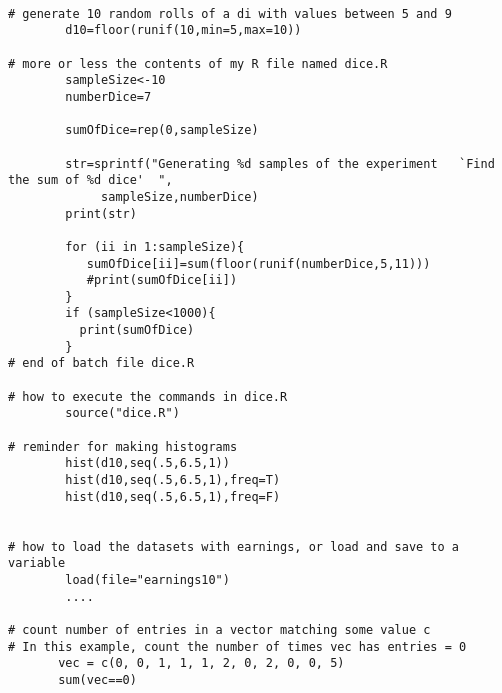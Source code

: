 \documentclass{report}
\begin{document}
\bigskip

\begin{verbatim}

# generate 10 random rolls of a di with values between 5 and 9
        d10=floor(runif(10,min=5,max=10))               
                                   
# more or less the contents of my R file named dice.R                                                                               
        sampleSize<-10
        numberDice=7

        sumOfDice=rep(0,sampleSize)

        str=sprintf("Generating %d samples of the experiment   `Find the sum of %d dice'  ",
             sampleSize,numberDice)
        print(str)

        for (ii in 1:sampleSize){
           sumOfDice[ii]=sum(floor(runif(numberDice,5,11)))
           #print(sumOfDice[ii])
        }
        if (sampleSize<1000){
          print(sumOfDice)
        }
# end of batch file dice.R

# how to execute the commands in dice.R
        source("dice.R")
        
# reminder for making histograms
        hist(d10,seq(.5,6.5,1))        
        hist(d10,seq(.5,6.5,1),freq=T)
        hist(d10,seq(.5,6.5,1),freq=F)


# how to load the datasets with earnings, or load and save to a variable
        load(file="earnings10")
        ....

# count number of entries in a vector matching some value c
# In this example, count the number of times vec has entries = 0
       vec = c(0, 0, 1, 1, 1, 2, 0, 2, 0, 0, 5)
       sum(vec==0)

\end{verbatim}
\end{document}
